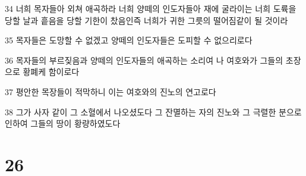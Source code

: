 \par 34 너희 목자들아 외쳐 애곡하라 너희 양떼의 인도자들아 재에 굴라이는 너희 도륙을 당할 날과 흩음을 당할 기한이 찼음인즉 너희가 귀한 그릇의 떨어짐같이 될 것이라
\par 35 목자들은 도망할 수 없겠고 양떼의 인도자들은 도피할 수 없으리로다
\par 36 목자들의 부르짖음과 양떼의 인도자들의 애곡하는 소리여 나 여호와가 그들의 초장으로 황폐케 함이로다
\par 37 평안한 목장들이 적막하니 이는 여호와의 진노의 연고로다
\par 38 그가 사자 같이 그 소혈에서 나오셨도다 그 잔멸하는 자의 진노와 그 극렬한 분으로 인하여 그들의 땅이 황량하였도다

\chapter{26}

